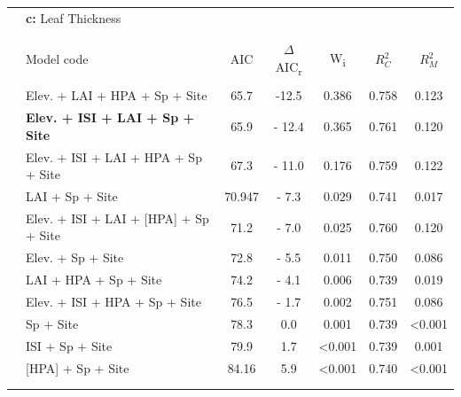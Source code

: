 \documentclass[a4paper,10pt,]{report}
\begin{document}
\begin{table}[H] \centering 
  \label{} 
\begin{tabular}{@{\extracolsep{10pt}} clSS[table-format=3.1]SSS} 
& \textbf{\Large{c:}} Leaf Thickness &&&&&\\

\\[-1.8ex]\hline 
\hline \\[-1.8ex] 
 & Model code  & {AIC} & {$\Delta$AIC\textsubscript{r}} & {W\textsubscript{i}} & {$R_C^2$} & {$R_M^2$} \\ 
\hline \\[-1.8ex] 
 & Elev. + LAI + HPA + Sp + Site &  65.7  &   -12.5  &  0.386  &  0.758  &  0.123  \\ 
 & \textbf{Elev. + ISI + LAI + Sp + Site} &  65.9  &   - 12.4  &  0.365  &  0.761  &  0.120  \\ 
 & Elev. + ISI + LAI + HPA + Sp + Site &  67.3  &   - 11.0  &  0.176  &  0.759  &  0.122  \\ 
 & LAI + Sp + Site &  70.947  &   - 7.3  &  0.029  &  0.741  &  0.017  \\ 
 & Elev. + ISI + LAI + [HPA] + Sp + Site &  71.2  &   - 7.0  &  0.025  &  0.760  &  0.120  \\ 
 & Elev. + Sp + Site &  72.8  &   - 5.5  &  0.011  &  0.750  &  0.086  \\ 
 & LAI + HPA + Sp + Site &  74.2  &   - 4.1  &  0.006  &  0.739  &  0.019  \\ 
 & Elev. + ISI + HPA + Sp + Site &  76.5  &   - 1.7  &  0.002  &  0.751  &  0.086  \\ 
 & Sp + Site &  78.3  &  0.0  &  0.001  &  0.739  &  <0.001  \\ 
 & ISI + Sp + Site &  79.9  &  1.7  &  <0.001  &  0.739  &  0.001  \\ 
 & [HPA] + Sp + Site &  84.16  &  5.9  &  <0.001  &  0.740  &  <0.001  \\ 
\hline \\[-1.8ex] 
\hline\\

\end{tabular} 
\end{table} 
\end{document}
